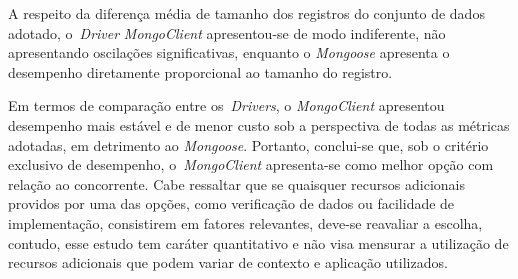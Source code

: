 \documentclass{svproc}
\begin{document}
A respeito da diferença média de tamanho dos registros do conjunto de dados adotado, o~\emph{Driver} \emph{MongoClient} apresentou-se de modo indiferente, não apresentando oscilações significativas, enquanto o \emph{Mongoose} apresenta o desempenho diretamente proporcional ao tamanho do registro.

Em termos de comparação entre os~\emph{Drivers}, o \emph{MongoClient} apresentou desempenho mais estável e de menor custo sob a perspectiva de todas as métricas adotadas, em detrimento ao \emph{Mongoose}. Portanto, conclui-se que, sob o critério exclusivo de desempenho, o~\emph{MongoClient} apresenta-se como melhor opção com relação ao concorrente. Cabe ressaltar que se quaisquer recursos adicionais providos por uma das opções, como verificação de dados ou facilidade de implementação, consistirem em fatores relevantes, deve-se reavaliar a escolha, contudo, esse estudo tem caráter quantitativo e não visa mensurar a utilização de recursos adicionais que podem variar de contexto e aplicação utilizados.





\end{document}
